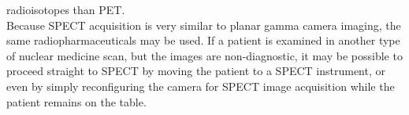 \documentclass{article}
\begin{document}
radioisotopes than PET.\\Because SPECT acquisition is very similar to planar gamma camera imaging, the same radiopharmaceuticals may be used. If a patient is examined in another type of nuclear medicine scan, but the images are non-diagnostic, it may be possible to proceed straight to SPECT by moving the patient to a SPECT instrument, or even by simply reconfiguring the camera for SPECT image acquisition while the patient remains on the table.
\end{document}
